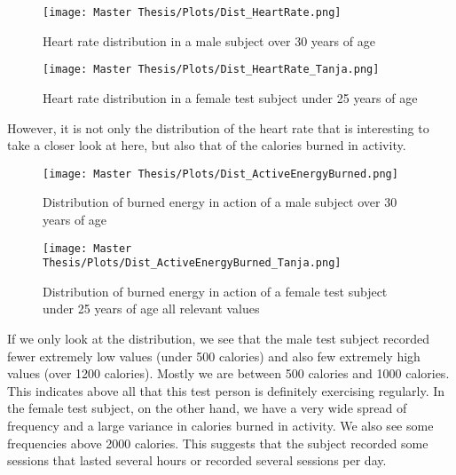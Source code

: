 \FloatBarrier
\begin{figure}[h!]
  \centering
  \begin{minipage}[b]{0.7\linewidth}
    \texttt{[image: Master Thesis/Plots/Dist\_HeartRate.png]}
    \caption{Heart rate distribution in a male subject over 30 years of age}
    \label{fig:DistHeartMichi}
  \end{minipage}
  \quad %
  \begin{minipage}[b]{0.7\linewidth}
    \texttt{[image: Master Thesis/Plots/Dist\_HeartRate\_Tanja.png]}
    \caption{Heart rate distribution in a female test subject under 25 years of age}
    \label{fig:DistHeartTanja}
  \end{minipage}
\end{figure}
\FloatBarrier

However, it is not only the distribution of the heart rate that is interesting to take a closer look at here, but also that of the calories burned in activity. 

\FloatBarrier
\begin{figure}[h!]
  \centering
  \begin{minipage}[b]{0.7\linewidth}
    \texttt{[image: Master Thesis/Plots/Dist\_ActiveEnergyBurned.png]}
    \caption{Distribution of burned energy in action of a male subject over 30 years of age}
    \label{fig:ValuesMichiactive}
  \end{minipage}
  \quad %
  \begin{minipage}[b]{0.7\linewidth}
    \texttt{[image: Master Thesis/Plots/Dist\_ActiveEnergyBurned\_Tanja.png]}
    \caption{Distribution of burned energy in action of a female test subject under 25 years of age all relevant values}
    \label{fig:ValuesTanjaactive}
  \end{minipage}
\end{figure}
\FloatBarrier

If we only look at the distribution, we see that the male test subject recorded fewer extremely low values (under 500 calories) and also few extremely high values (over 1200 calories). Mostly we are between 500 calories and 1000 calories. This indicates above all that this test person is definitely exercising regularly.
In the female test subject, on the other hand, we have a very wide spread of frequency and a large variance in calories burned in activity. We also see some frequencies above 2000 calories. This suggests that the subject recorded some sessions that lasted several hours or recorded several sessions per day.

